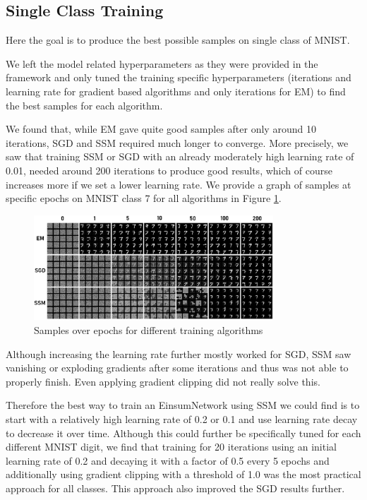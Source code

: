 \subsection{Single Class Training}
\label{sec:exp_mnist_single}

Here the goal is to produce the best possible samples on single class of MNIST.

We left the model related hyperparameters as they were provided in the framework and only tuned the training specific hyperparameters 
(iterations and learning rate for gradient based algorithms and only iterations for EM) to find the best samples for each algorithm. 

We found that, while EM gave quite good samples after only around 10 iterations, SGD and SSM required much longer to converge. 
More precisely, we saw that training SSM or SGD with an already moderately high learning rate
of 0.01, needed around 200 iterations to produce good results, which of course increases more if we set a lower learning rate.
We provide a graph of samples at specific epochs on MNIST class 7 for all algorithms in Figure \ref{fig:mnist_epochs}.\\ 

\begin{figure}[H]
    \centering
    \includegraphics[width=0.8\textwidth]{figures/einsum/mnist/epoch_comparison.png}
    \caption{Samples over epochs for different training algorithms}
    \label{fig:mnist_epochs}
\end{figure}

Although increasing the learning rate further mostly worked for SGD, SSM saw vanishing or exploding gradients after some iterations and thus was
not able to properly finish. Even applying gradient clipping did not really solve this. 

Therefore the best way to train an EinsumNetwork using SSM we could find is to start with a relatively 
high learning rate of 0.2 or 0.1 and use learning rate decay to decrease it over time. Although
this could further be specifically tuned for each different MNIST digit, we find that training for 
20 iterations using an initial learning rate of 0.2 and decaying it with a factor of 0.5 every 5 epochs 
and additionally using gradient clipping with a threshold of 1.0 was the most practical approach for all classes.
This approach also improved the SGD results further.

